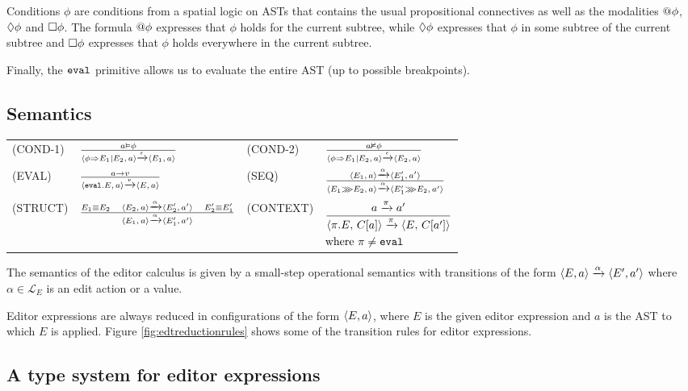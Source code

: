 Conditions $\phi$ are conditions from a spatial logic on ASTs that contains
the usual propositional connectives as well as the modalities
$\at{\phi}$, $\possibly{\phi}$ and $\necessarily{\phi}$. The formula
$\at{\phi}$ expresses that $\phi$ holds for the current subtree, while
$\possibly{\phi}$ expresses that $\phi$ in some subtree of the current
subtree and $\necessarily{\phi}$ expresses that $\phi$ holds
everywhere in the current subtree.

Finally, the $\eval$ primitive allows us to evaluate the entire AST
(up to possible breakpoints).

\subsection{Semantics}

\begin{figure*}
  \center
  \renewcommand{\arraystretch}{2}
  \begin{tabular}{llll}
    \scriptsize(COND-1)  & $ \CondOne $           & \scriptsize(COND-2) & $ \CondTwo$ \\
    \scriptsize(EVAL)    & $ \Eval $              & \scriptsize(SEQ)    & $ \Seq$     \\
    \scriptsize(STRUCT)  & $\Struct$              & \scriptsize(CONTEXT)& \scriptsize$\Context$
  \end{tabular}
  \caption{Examples of transition rules for editor expressions}
  \label{fig:edtreductionrules}
\end{figure*}

The semantics of the editor calculus is given by a small-step
operational semantics with transitions of the form
$\conf{E, a} \transition{$\alpha$} \conf{E', a'}$ where
$\alpha \in \mathcal{L}_E$ is an edit action or a value.

Editor expressions are always reduced in configurations of the form
$\conf{E,a}$, where $E$ is the given editor expression and $a$ is the
AST to which $E$ is applied. Figure
\ref{fig:edtreductionrules} shows some of the transition rules for editor
expressions.


\subsection{A type system for editor expressions}

